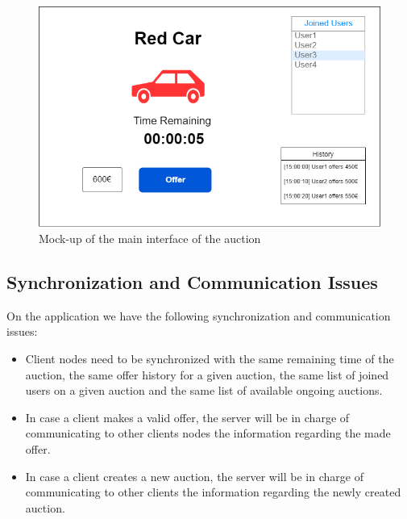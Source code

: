 \begin{figure}[H]
	\centering
	\includegraphics[width=0.7\linewidth]{img/wireframeDSMT.drawio}
	\caption{Mock-up of the main interface of the auction}
	\label{fig:wireframedsmt}
\end{figure}

\subsection{Synchronization and Communication Issues}\label{synchComIssues}
On the application we have the following synchronization and communication issues:
\begin{itemize}
	\item Client nodes need to be synchronized with the same remaining time of the auction, the same offer history for a given auction, the same list of joined users on a given auction and the same list of available ongoing auctions.
	\item In case a client makes a valid offer, the server will be in charge of  communicating to other clients nodes the information regarding the made offer. 
	\item In case a client creates a new auction, the server will be in charge of communicating to other clients the information regarding the newly created auction.
\end{itemize}
